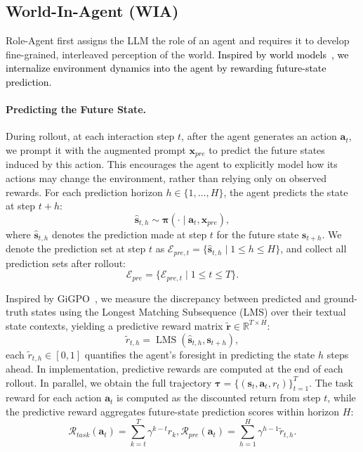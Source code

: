\documentclass[11pt]{article}
\begin{document}
\subsection{World-In-Agent (WIA)}
Role-Agent first assigns the LLM the role of an agent and requires it to develop fine-grained, interleaved perception of the world. \textcolor{black}{Inspired by world models~\cite{li2025codei,gu2024your}, we internalize environment dynamics into the agent by rewarding future-state prediction.}

\paragraph{Predicting the Future State.}
During rollout, at each interaction step $t$, after the agent generates an action $\bm{a}_t$, we prompt it with the augmented prompt $\bm{x}_{pre}$ to predict the future states induced by this action. This encourages the agent to explicitly model how its actions may change the environment, rather than relying only on observed rewards. For each prediction horizon $h\in\{1,\ldots,H\}$, the agent predicts the state at step $t+h$:
\begin{equation}
    \hat{\bm{s}}_{t,h} \sim \bm{\pi}(\cdot \mid \bm{a}_t,\bm{x}_{pre}),
\end{equation}
where $\hat{\bm{s}}_{t,h}$ denotes the prediction made at step $t$ for the future state $\bm{s}_{t+h}$. We denote the prediction set at step $t$ as $\mathcal{E}_{pre,t}=\{\hat{\bm{s}}_{t,h}\mid 1\le h\le H\}$, and collect all prediction sets after rollout:
\begin{equation}
    \mathcal{E}_{pre}=\{\mathcal{E}_{pre,t}\mid1\le t\le T\}.
\end{equation}

Inspired by GiGPO~\cite{feng2025group}, we measure the discrepancy between predicted and ground-truth states using the Longest Matching Subsequence (LMS) over their textual state contexts, yielding a predictive reward matrix $\tilde{\bm{r}}\in\mathbb{R}^{T\times H}$:
\begin{equation}
    \tilde{r}_{t,h}=\operatorname{LMS}(\hat{\bm{s}}_{t,h},\bm{s}_{t+h}),
\end{equation}
each $\tilde{r}_{t,h}\in[0,1]$ quantifies the agent's foresight in predicting the state $h$ steps ahead. In implementation, predictive rewards are computed at the end of each rollout. In parallel, we obtain the full trajectory $\bm{\tau}=\{(\bm{s}_t,\bm{a}_t,r_t)\}_{t=1}^T$. The task reward for each action $\bm{a}_t$ is computed as the discounted return from step $t$, while the predictive reward aggregates future-state prediction scores within horizon $H$:
\begin{equation}
\mathcal{R}_{task}(\bm{a}_t)\!\!=\!\!\sum_{k=t}^T\gamma^{k-t}r_k, 
     \mathcal{R}_{pre}(\bm{a}_t)\!\!=\!\!\sum_{h=1}^{H}\gamma^{h-1}\tilde{r}_{t,h}. 
\end{equation}
\end{document}
